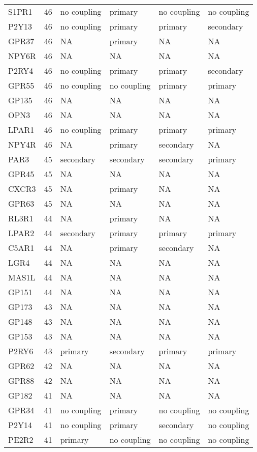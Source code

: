 \begin{longtable}{lrllll}
S1PR1 & 46 & no coupling & primary & no coupling & no coupling\\
P2Y13 & 46 & no coupling & primary & primary & secondary\\
GPR37 & 46 & NA & primary & NA & NA\\
\addlinespace
NPY6R & 46 & NA & NA & NA & NA\\
P2RY4 & 46 & no coupling & primary & primary & secondary\\
GPR55 & 46 & no coupling & no coupling & primary & primary\\
GP135 & 46 & NA & NA & NA & NA\\
OPN3 & 46 & NA & NA & NA & NA\\
\addlinespace
LPAR1 & 46 & no coupling & primary & primary & primary\\
NPY4R & 46 & NA & primary & secondary & NA\\
PAR3 & 45 & secondary & secondary & secondary & primary\\
GPR45 & 45 & NA & NA & NA & NA\\
CXCR3 & 45 & NA & primary & NA & NA\\
\addlinespace
GPR63 & 45 & NA & NA & NA & NA\\
RL3R1 & 44 & NA & primary & NA & NA\\
LPAR2 & 44 & secondary & primary & primary & primary\\
C5AR1 & 44 & NA & primary & secondary & NA\\
LGR4 & 44 & NA & NA & NA & NA\\
\addlinespace
MAS1L & 44 & NA & NA & NA & NA\\
GP151 & 44 & NA & NA & NA & NA\\
GP173 & 43 & NA & NA & NA & NA\\
GP148 & 43 & NA & NA & NA & NA\\
GP153 & 43 & NA & NA & NA & NA\\
\addlinespace
P2RY6 & 43 & primary & secondary & primary & primary\\
GPR62 & 42 & NA & NA & NA & NA\\
GPR88 & 42 & NA & NA & NA & NA\\
GP182 & 41 & NA & NA & NA & NA\\
GPR34 & 41 & no coupling & primary & no coupling & no coupling\\
\addlinespace
P2Y14 & 41 & no coupling & primary & secondary & no coupling\\
PE2R2 & 41 & primary & no coupling & no coupling & no coupling\\

\end{longtable}

